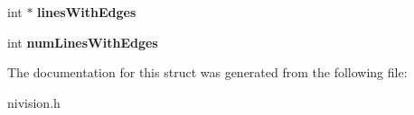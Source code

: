 \begin{DoxyCompactItemize}
\item 
\hypertarget{structConcentricRakeReport__struct_a83e2e046e6f7bb21341e21920f86ef1a}{
int $\ast$ {\bfseries linesWithEdges}}
\label{structConcentricRakeReport__struct_a83e2e046e6f7bb21341e21920f86ef1a}

\item 
\hypertarget{structConcentricRakeReport__struct_aff464240ebce8196f8add71bc5643991}{
int {\bfseries numLinesWithEdges}}
\label{structConcentricRakeReport__struct_aff464240ebce8196f8add71bc5643991}

\end{DoxyCompactItemize}


The documentation for this struct was generated from the following file:\begin{DoxyCompactItemize}
\item 
nivision.h\end{DoxyCompactItemize}
